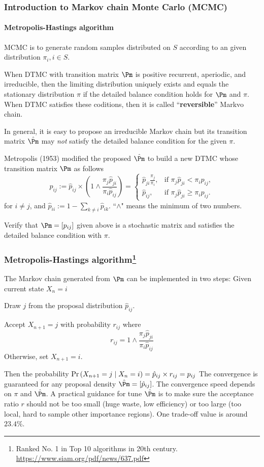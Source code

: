\documentclass[english,10pt]{beamer}
\begin{document}
 \begin{frame}
 \frametitle{Introduction to Markov chain Monte Carlo (MCMC)}
 \framesubtitle{Metropolis-Hastings algorithm}
MCMC is to generate random
samples distributed on $S$ according to an given distribution 
$\pi_i, i\in S$.
\biz
\item When DTMC with transition matrix $\Pm$ is positive recurrent, aperiodic, and irreducible,
then the   limiting distribution uniquely exists
and equals the stationary distribution $\pi$ if the detailed balance condition holds
for $\Pm$ and $\pi$. When DTMC satisfies these coditions, then it is called ``{\bf reversible}'' Markvo chain.

\item In general, it is easy to propose 
an irreducible Markov chain but its transition matrix $\hat{\Pm}$ may {\it not} satisfy the detailed 
balance condition for the given 
$\pi$.

\item Metropolis (1953) modified the proposed 
$\hat{\Pm}$  to build a new DTMC whose transition matrix $\Pm$ as follows
\[
p_{ij}:= \hat{p}_{ij} \times 
\left(1 \wedge  \frac{\pi_j \hat{p}_{ji}}{ \pi_i \hat{p}_{ij} }
\right) 
=\begin{cases}
\hat{p}_{ji}\frac{\pi_j}{\pi_i}, & \mbox{if }  \pi_j \hat{p}_{ji} < \pi_i \hat{p}_{ij}, \\
\hat{p}_{ij},  & \mbox{if }  \pi_j \hat{p}_{ji} \geq  \pi_i \hat{p}_{ij}. 
\end{cases} 
\]
for  $i\neq j$, and $\hat{p}_{ii} := 1 - \sum_{k\neq i} \hat{p}_{ik}$.
``$\wedge$" means the minimum of two numbers. 
\item {\hw} Verify that $ {\Pm}=[ {p}_{ij}]$ given above 
is a stochastic matrix and satisfies the detailed 
balance condition with $\pi$.
\eiz
\end{frame}
 
\begin{frame}
\frametitle{Metropolis-Hastings algorithm\footnote{ 
Ranked No. 1 in Top 10 algorithms in 20th century.
\url{https://www.siam.org/pdf/news/637.pdf}}}
The Markov chain generated from $ {\Pm}$ can be implemented in two steps:
Given current state $X_n=i$
\biz
\item Draw $j$ from the proposal distribution $\hat{p}_{ij}$.
\item Accept $X_{n+1}=j$ with probability $r_{ij}$ where 
\[ r_{ij} =  {1}\wedge{  \frac{\pi_j \hat{p}_{ji}} { \pi_i \hat{p}_{ij}} }\] 
 Otherwise, set $X_{n+1}=i$.
 \item Then the probability   
 ${\Pr\left(X_{n+1}=j\mid X_n=i\right)} = \hat{p}_{ij}\times r_{ij} = p_{ij} $
\eiz 
\pause 
\medskip
The convergence is guaranteed for any proposal density $\hat{\Pm}=[\hat{p}_{ij}]$.
The convergence speed depends on $\pi$ and $\hat{\Pm}$.
A practical guidance for tune $\hat{\Pm}$ is to make sure the acceptance ratio 
$r$ should not be too small (huge waste, low efficiency) or too large
(too local, hard to sample other importance regions).
One trade-off value is around $23.4\%$.
 
\end{frame}
\end{document}
